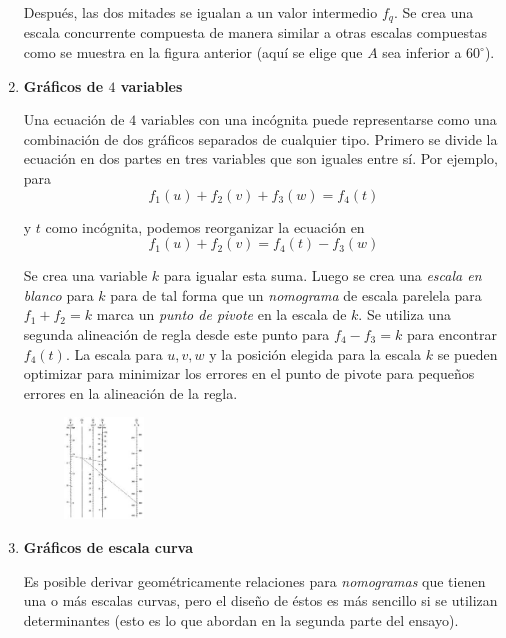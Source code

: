\documentclass[letterpaper,11pt]{article}
\begin{document}
\begin{enumerate}
    Después, las dos mitades se igualan a un valor intermedio $f_{q}$. Se crea 
    una escala concurrente compuesta de manera similar a otras escalas 
    compuestas como se muestra en la figura anterior (aquí se elige que 
    $A$ sea inferior a $60^{\circ}$). 

    \item \textbf{Gráficos de $4$ variables}

    Una ecuación de $4$ variables con una incógnita puede representarse como 
    una combinación de dos gráficos separados de cualquier tipo. Primero
    se divide la ecuación en dos partes en tres variables que son iguales 
    entre sí. Por ejemplo, para 
    \begin{equation*}
        f_{1} (u) + f_{2} (v) + f_{3} (w) = f_{4} (t)
    \end{equation*}

    y $t$ como incógnita, podemos reorganizar la ecuación en
    \begin{equation*}
        f_{1} (u) + f_{2} (v) = f_{4} (t) - f_{3} (w)
    \end{equation*}

    Se crea una variable $k$ para igualar esta suma. Luego se crea una
    \textit{escala en blanco} para $k$ para de tal forma que un 
    \textit{nomograma} de escala parelela para $f_{1} + f_{2} = k$ marca un 
    \textit{punto de pivote} en la escala de $k$. Se utiliza una segunda 
    alineación de regla desde este punto para $f_{4} - f_{3} = k$ para 
    encontrar $f_{4} (t)$. La escala para $u, v, w$ y la posición elegida para 
    la escala $k$ se pueden optimizar para minimizar los errores en el punto de
    pivote para pequeños errores en la alineación de la regla. 

    \begin{figure}[htb]
        \centering
        \includegraphics[width=0.2\textwidth]{./imagenes/image018.jpg}
    \end{figure} 
    
    \item \textbf{Gráficos de escala curva}
    
    Es posible derivar geométricamente relaciones para \textit{nomogramas} que 
    tienen una o más escalas curvas, pero el diseño de éstos es más sencillo si 
    se utilizan determinantes (esto es lo que abordan en la segunda parte del 
    ensayo). 
\end{enumerate}
\end{document}
